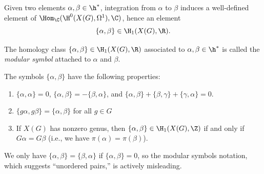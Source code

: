 \documentclass{report}
\begin{document}
Given two elements $\alpha,\beta\in\h^*$, integration from
$\alpha$ to $\beta$ induces a well-defined element of
$\Hom_{\C}(\H^0(X(G),\Omega^1),\C)$, hence an element
$$\{\alpha,\beta\}\in \H_1(X(G),\R).$$
\begin{definition}
The homology class $\{\alpha,\beta\}\in \H_1(X(G),\R)$ associated
to $\alpha,\beta\in\h^*$ is called the {\em modular symbol}
attached to $\alpha$ and $\beta$.
\end{definition}


\begin{proposition}\label{prop:modsymprop}
The symbols $\{\alpha,\beta\}$ have the following properties:
\begin{enumerate}
\item $\{\alpha,\alpha\}=0$, $\{\alpha,\beta\}=-\{\beta,\alpha\}$,
and $\{\alpha,\beta\} + \{\beta,\gamma\} + \{\gamma,\alpha\}=0$.
\item $\{g \alpha, g\beta\} = \{\alpha,\beta\}$ for all $g\in G$
\item If $X(G)$ has nonzero genus, then $\{\alpha,\beta\}\in
\H_1(X(G),\Z)$ if and only if $G\alpha=G\beta$ (i.e., we
have $\pi(\alpha)=\pi(\beta)$).
\end{enumerate}
\end{proposition}

\begin{remark}
We only have $\{\alpha,\beta\} = \{\beta,\alpha\}$ if
$\{\alpha,\beta\}=0$, so the modular symbols notation, which
suggests ``unordered pairs,'' is actively misleading.
\end{remark}
\end{document}
